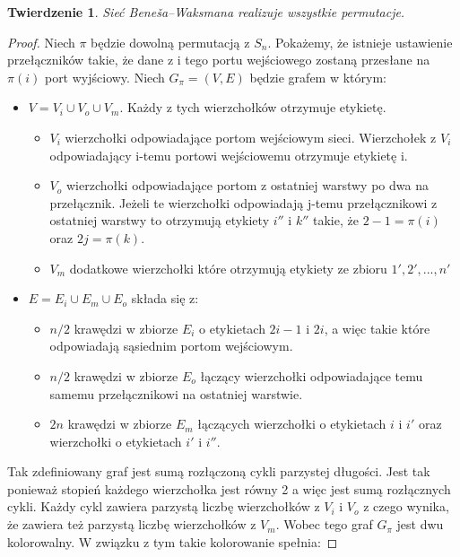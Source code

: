\documentclass[a4paper]{article}
\newtheorem{tw}{Twierdzenie}[section]
\theoremstyle{definition}
\begin{document}
\begin{tw}
    Sieć Beneša--Waksmana realizuje wszystkie permutacje.
\end{tw}
\begin{proof}
    Niech $\pi$ będzie dowolną permutacją z $S_n$. Pokażemy, że istnieje ustawienie przełączników takie, że dane z i tego portu wejściowego zostaną przesłane na $\pi(i)$ port wyjściowy. 
    Niech $G_\pi = (V, E)$ będzie grafem w którym:
    \begin{itemize}
        \item $V = V_i \cup V_o \cup V_m$. Każdy z tych wierzchołków otrzymuje etykietę.
        \begin{itemize}
            \item $V_i$ wierzchołki odpowiadające portom wejściowym sieci.
             Wierzchołek z $V_i$ odpowiadający i-temu portowi wejściowemu otrzymuje etykietę i.
            \item $V_o$ wierzchołki odpowiadające portom z ostatniej warstwy po dwa na przełącznik. Jeżeli te wierzchołki odpowiadają j-temu przełącznikowi z ostatniej warstwy to otrzymują etykiety $i''$ i $k''$ takie, że $2 - 1 = \pi(i)$ oraz $2j = \pi(k)$.
            \item $V_m$ dodatkowe wierzchołki które otrzymują etykiety ze zbioru ${1', 2', ..., n'}$
        \end{itemize}
        \item $E = E_i \cup E_m \cup E_o$ składa się z:
        \begin{itemize}
            \item $n/2$ krawędzi w zbiorze $E_i$ o etykietach $2i-1$ i $2i$, a więc takie które odpowiadają sąsiednim portom wejściowym.
            \item $n/2$ krawędzi w zbiorze $E_o$ łączący wierzchołki odpowiadające temu samemu przełącznikowi na ostatniej warstwie.
            \item  $2n$ krawędzi w zbiorze $E_m$ łączących wierzchołki o etykietach $i$ i $i'$ oraz wierzchołki o etykietach $i'$ i $i''$.
        \end{itemize}
    \end{itemize} 
    Tak zdefiniowany graf jest sumą rozłączoną cykli parzystej długości. Jest tak ponieważ stopień każdego wierzchołka jest równy 2 a więc jest sumą rozłącznych cykli. Każdy cykl zawiera parzystą liczbę wierzchołków z $V_i$ i $V_o$ z czego wynika, że zawiera też parzystą liczbę wierzchołków z $V_m$.
    Wobec tego graf $G_\pi$ jest dwu kolorowalny.
    W związku z tym takie kolorowanie spełnia:

\end{proof}
\end{document}
